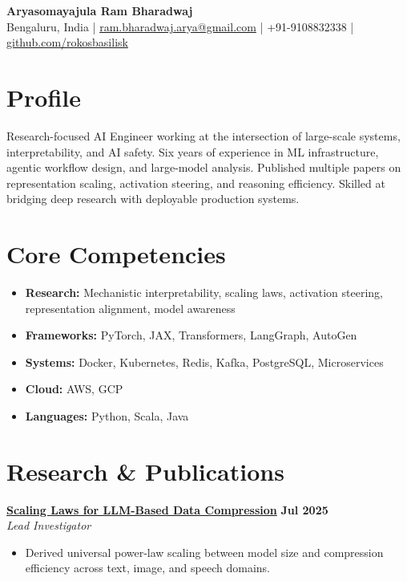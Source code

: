 \documentclass[11pt]{article}
\begin{document}
\begin{center}
\textbf{\Large Aryasomayajula Ram Bharadwaj} \\
\vspace{4pt}
Bengaluru, India | \href{mailto:ram.bharadwaj.arya@gmail.com}{ram.bharadwaj.arya@gmail.com} | +91-9108832338 | \href{https://github.com/rokosbasilisk}{github.com/rokosbasilisk}
\end{center}

\vspace{12pt}

\section{Profile}
Research-focused AI Engineer working at the intersection of large-scale systems, interpretability, and AI safety. Six years of experience in ML infrastructure, agentic workflow design, and large-model analysis. Published multiple papers on representation scaling, activation steering, and reasoning efficiency. Skilled at bridging deep research with deployable production systems.

\section{Core Competencies}
\begin{itemize}[leftmargin=*,nosep]
\item \textbf{Research:} Mechanistic interpretability, scaling laws, activation steering, representation alignment, model awareness
\item \textbf{Frameworks:} PyTorch, JAX, Transformers, LangGraph, AutoGen
\item \textbf{Systems:} Docker, Kubernetes, Redis, Kafka, PostgreSQL, Microservices
\item \textbf{Cloud:} AWS, GCP
\item \textbf{Languages:} Python, Scala, Java
\end{itemize}

\section{Research \& Publications}
\textbf{\href{https://fullwrong.com/2025/07/23/scaling-compression/}{Scaling Laws for LLM-Based Data Compression}} \hfill \textbf{Jul 2025}\\
\textit{Lead Investigator}
\begin{itemize}[leftmargin=*,nosep]
\item Derived universal power-law scaling between model size and compression efficiency across text, image, and speech domains.
\end{itemize}
\end{document}
